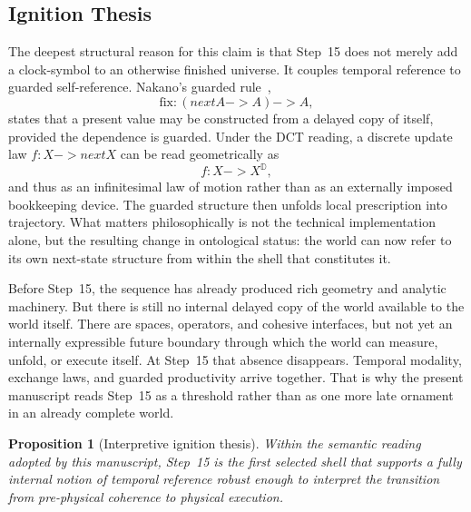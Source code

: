 \documentclass[11pt,a4paper]{article}
\def\to{->}%
\def\bigcirc{next}%
\theoremstyle{plain}
\newtheorem{proposition}[theorem]{Proposition}
\theoremstyle{definition}
\theoremstyle{remark}
\newcommand{\D}{\mathbb{D}}
\newcommand{\nextmod}{\bigcirc}
\newcommand{\fix}{\mathrm{fix}}
\begin{document}
\subsection{Ignition Thesis}
\label{subsec:ignition-thesis}

\noindent The deepest structural reason for this claim is that Step~15 does not merely add a clock-symbol to an otherwise finished universe.
It couples temporal reference to guarded self-reference.
Nakano's guarded rule~\cite{nakano},
\begin{equation}
\label{eq:lob}
    \fix : (\nextmod A \to A) \to A,
\end{equation}
states that a present value may be constructed from a delayed copy of itself, provided the dependence is guarded.
Under the DCT reading, a discrete update law $f : X \to \nextmod X$ can be read geometrically as
\begin{equation}
\label{eq:vector-field}
    f : X \to X^{\D},
\end{equation}
and thus as an infinitesimal law of motion rather than as an externally imposed bookkeeping device.
The guarded structure then unfolds local prescription into trajectory.
What matters philosophically is not the technical implementation alone, but the resulting change in ontological status: the world can now refer to its own next-state structure from within the shell that constitutes it.

Before Step~15, the sequence has already produced rich geometry and analytic machinery.
But there is still no internal delayed copy of the world available to the world itself.
There are spaces, operators, and cohesive interfaces, but not yet an internally expressible future boundary through which the world can measure, unfold, or execute itself.
At Step~15 that absence disappears.
Temporal modality, exchange laws, and guarded productivity arrive together.
That is why the present manuscript reads Step~15 as a threshold rather than as one more late ornament in an already complete world.

\begin{proposition}[Interpretive ignition thesis]
\label{prop:ignition}
Within the semantic reading adopted by this manuscript, Step~15 is the first selected shell that supports a fully internal notion of temporal reference robust enough to interpret the transition from pre-physical coherence to physical execution.
\end{proposition}
\end{document}
